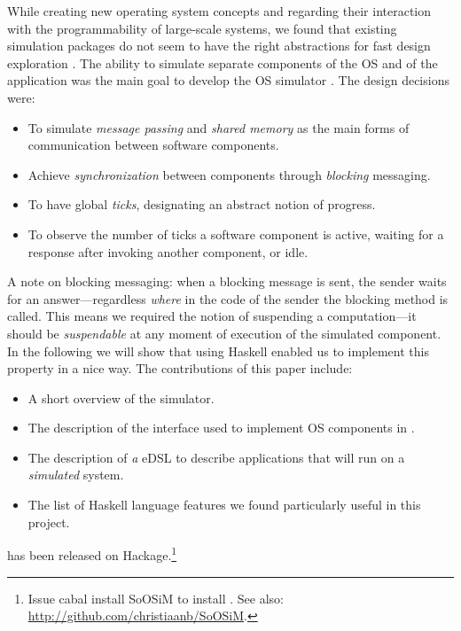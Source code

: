 While creating new operating system concepts and regarding their interaction with the programmability of large-scale systems, we found that existing simulation packages do not seem to have the right abstractions for fast design exploration \cite{cotson,omnet}.
The ability to simulate separate components of the OS and of the application was the main goal to develop the OS simulator \soosim \cite{Baaij:2012}.
The design decisions were:
\begin{itemize}
\item To simulate \emph{message passing} and \emph{shared memory} as the main forms of communication between software components.
\item Achieve \emph{synchronization} between components through \emph{blocking} messaging.
\item To have global \emph{ticks}, designating an abstract notion of progress.
\item To observe the number of ticks a software component is active, waiting for a response after invoking another component, or idle.
\end{itemize}
A note on blocking messaging: when a blocking message is sent, the sender waits for an answer---regardless \emph{where} in the code of the sender the blocking  method is called.
This means we required the notion of suspending a computation---it should be \emph{suspendable} at any moment of execution of the simulated component.
In the following we will show that using Haskell \cite{haskell-report} enabled us to implement this property in a nice way.
The contributions of this paper include:
\begin{itemize}
\item A short overview of the \soosim simulator.
\item The description of the interface used to implement OS components in \soosim.
\item The description of \emph{a} eDSL to describe applications that will run on a \soosim \emph{simulated} system.
\item The list of Haskell language features we found particularly useful in this project.
\end{itemize}
\soosim has been released on Hackage.\footnote{Issue \textsf{cabal install SoOSiM} to install \soosim. See also: \url{http://github.com/christiaanb/SoOSiM}.}

